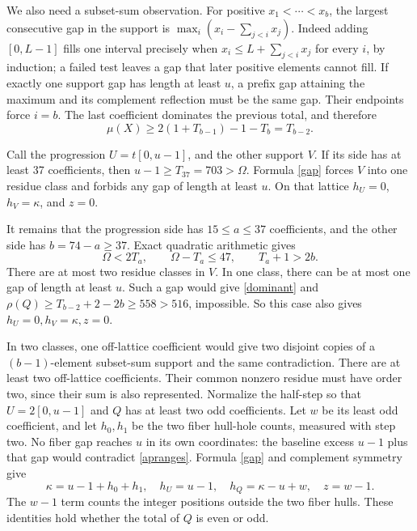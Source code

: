 \documentclass[11pt,a4paper]{article}
\begin{document}
We also need a subset-sum observation. For positive
$x_1<\cdots<x_b$, the largest consecutive gap in the support is
$\max_i(x_i-\sum_{j<i}x_j)$. Indeed adding $[0,L-1]$ fills one
interval precisely when $x_i\le L+\sum_{j<i}x_j$ for every $i$,
by induction; a failed test leaves a gap that later positive elements
cannot fill. If exactly one support gap has length at least $u$,
a prefix gap attaining the maximum and its complement reflection
must be the same gap. Their endpoints force $i=b$.
The last coefficient dominates the previous total, and therefore
\begin{equation}\label{dominant}
 \mu(X)\ge2(1+T_{b-1})-1-T_b=T_{b-2}.
\end{equation}

Call the progression $U=t[0,u-1]$, and the other support $V$.
If its side has at least 37 coefficients, then
$u-1\ge T_{37}=703>\Omega$. Formula \eqref{gap} forces $V$
into one residue class and forbids any gap of length at least $u$.
On that lattice $h_U=0$, $h_V=\kappa$, and $z=0$.

It remains that the progression side has $15\le a\le37$ coefficients,
and the other side has $b=74-a\ge37$. Exact quadratic arithmetic gives
\begin{equation}\label{apranges}
 \Omega<2T_a,\qquad \Omega-T_a\le47,\qquad T_a+1>2b.
\end{equation}
There are at most two residue classes in $V$.
In one class, there can be at most one gap of length at least $u$.
Such a gap would give \eqref{dominant} and
$\rho(Q)\ge T_{b-2}+2-2b\ge558>516$, impossible.
So this case also gives $h_U=0,h_V=\kappa,z=0$.

In two classes, one off-lattice coefficient would give two disjoint
copies of a $(b-1)$-element subset-sum support and the same contradiction.
There are at least two off-lattice coefficients. Their common nonzero
residue must have order two, since their sum is also represented.
Normalize the half-step so that $U=2[0,u-1]$ and $Q$ has at least
two odd coefficients. Let $w$ be its least odd coefficient, and let
$h_0,h_1$ be the two fiber hull-hole counts, measured with step two.
No fiber gap reaches $u$ in its own coordinates: the baseline excess
$u-1$ plus that gap would contradict \eqref{apranges}. Formula
\eqref{gap} and complement symmetry give
\begin{equation}\label{fibers}
 \kappa=u-1+h_0+h_1,\quad h_U=u-1,\quad
 h_Q=\kappa-u+w,\quad z=w-1.
\end{equation}
The $w-1$ term counts the integer positions outside the two fiber hulls.
These identities hold whether the total of $Q$ is even or odd.
\end{document}

